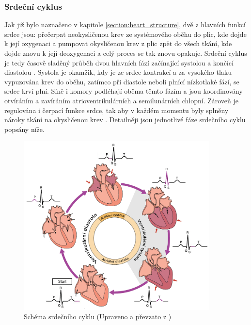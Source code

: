 \subsubsection{Srdeční cyklus}
\label{section:cardiac_cycle}
Jak již bylo naznačeno v kapitole \ref{section:heart_structure}, dvě z hlavních
funkcí srdce jsou: přečerpat neokysličenou krev ze systémového oběhu do plic,
kde dojde k její oxygenaci a pumpovat okysličenou krev z plic zpět do všech
tkání, kde dojde znovu k její deoxygenaci a celý proces se tak znovu opakuje.
Srdeční cyklus je tedy časově sladěný průběh dvou hlavních fází začínající
systolou a končící diastolou \cite{Weinhaus2005}. Systola je okamžik, kdy je ze
srdce kontrakcí a za vysokého tlaku vypuzována krev do oběhu, zatímco při
diastole neboli plnící nízkotlaké fází, se srdce krví plní. Síně i komory
podléhají oběma těmto fázím a jsou koordinovány otvíráním a zavíráním
atrioventrikulárních a semilunárních chlopní. Zároveň je regulována i čerpací
funkce srdce, tak aby v každém momentu byly splněny nároky tkání na okysličenou
krev \cite{OpenStax}. Detailněji jsou jednotlivé fáze srdečního cyklu popsány
níže.

\begin{figure}[h]
	\begin{center}
		\includegraphics[width=0.9\textwidth]{../assets/anatomy/cardiac_cycle}
		\caption{Schéma srdečního cyklu (Upraveno a převzato z
			\cite{OpenStax})}
		\label{fig:cardiac_cycle}
	\end{center}
\end{figure}

